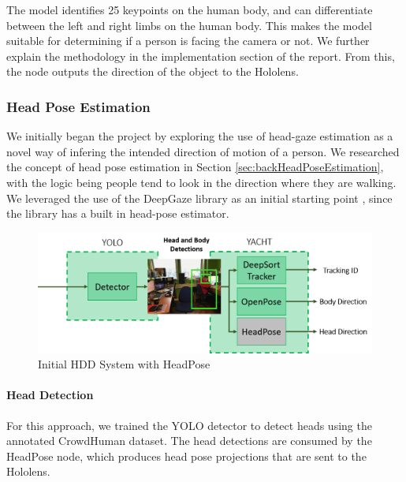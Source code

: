 The model identifies 25 keypoints on the human body, and can differentiate between the left and right limbs on the human body. This makes the model suitable for determining if a person is facing the camera or not. We further explain the methodology in the implementation section of the report. From this, the node outputs the direction of the object to the Hololens.

\subsubsection{Head Pose Estimation}
We initially began the project by exploring the use of head-gaze estimation as a novel way of infering the intended direction of motion of a person. We researched the concept of head pose estimation in Section \ref{sec:backHeadPoseEstimation}, with the logic being people tend to look in the direction where they are walking. We leveraged the use of the DeepGaze library as an initial starting point \cite{Patacchiola2017a}, since the library has a built in head-pose estimator. 

\begin{figure}[ht]
	\centering
	\includegraphics[width=1.0\linewidth]{img/chapter4_analysis/hddSystemHeadPose.png}
	\caption{Initial HDD System with HeadPose}
	\label{fig:headPoseHDD}
	\vspace{-1\baselineskip}
\end{figure}

\paragraph{Head Detection} For this approach, we trained the YOLO detector to detect heads using the annotated CrowdHuman dataset. The head detections are consumed by the HeadPose node, which produces head pose projections that are sent to the Hololens.

